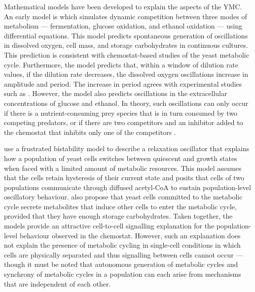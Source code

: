Mathematical models have been developed to explain the aspects of the YMC.
An early model is \textcite{jonesCyberneticModelGrowth1999} which simulates dynamic competition between three modes of metabolism --- fermentation, glucose oxidation, and ethanol oxidation --- using differential equations.
This model predicts spontaneous generation of oscillations in dissolved oxygen, cell mass, and storage carbohydrates in continuous cultures.
This prediction is consistent with chemostat-based studies of the yeast metabolic cycle.
Furthermore, the model predicts that, within a window of dilution rate values, if the dilution rate decreases, the dissolved oxygen oscillations increase in amplitude and period.
The increase in period agrees with experimental studies such as \textcite{oneillEukaryoticCellBiology2020}.
However, the model also predicts oscillations in the extracellular concentrations of glucose and ethanol.
In theory, such oscillations can only occur if there is a nutrient-consuming prey species that is in turn consumed by two competing predators, or if there are two competitors and an inhibitor added to the chemostat that inhibits only one of the competitors \parencite{smithTheoryChemostatDynamics1995}. %

\textcite{krishnaMinimalPushPull2018} use a frustrated bistability model to describe a relaxation oscillator that explains how a population of yeast cells switches between quiescent and growth states when faced with a limited amount of metabolic resources.
This model assumes that the cells retain hysteresis of their current state and posits that cells of two populations communicate through diffused acetyl-CoA to sustain population-level oscillatory behaviour.
\textcite{burnettiCellCycleStart2016} also propose that yeast cells committed to the metabolic cycle secrete metabolites that induce other cells to enter the metabolic cycle, provided that they have enough storage carbohydrates.
Taken together, the models provide an attractive cell-to-cell signalling explanation for the population-level behaviour observed in the chemostat.
However, such an explanation does not explain the presence of metabolic cycling in single-cell conditions in which cells are physically separated and thus signalling between cells cannot occur --- though it must be noted that autonomous generation of metabolic cycles and synchrony of metabolic cycles in a population can each arise from mechanisms that are independent of each other.

